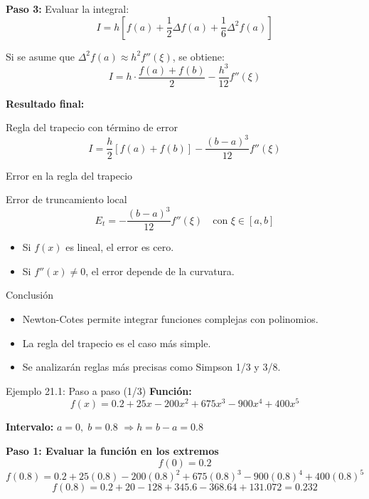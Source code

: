\documentclass[main.tex]{subfiles}
\begin{document}
\begin{frame}
    
\textbf{Paso 3:} Evaluar la integral:
\[ I = h \left[ f(a) + \frac{1}{2} \Delta f(a) + \frac{1}{6} \Delta^2 f(a) \right] \]

Si se asume que \( \Delta^2 f(a) \approx h^2 f''(\xi) \), se obtiene:
\[ I = h \cdot \frac{f(a) + f(b)}{2} - \frac{h^3}{12} f''(\xi) \]

\textbf{Resultado final:}
\begin{block}{Regla del trapecio con término de error}
\[ I = \frac{h}{2} [f(a) + f(b)] - \frac{(b - a)^3}{12} f''(\xi) \]
\end{block}
\end{frame}
\begin{frame}{Error en la regla del trapecio}
  \begin{block}{Error de truncamiento local}
    \[ E_t = -\frac{(b - a)^3}{12} f''(\xi) \quad \text{con } \xi \in [a,b] \]
  \end{block}
  \begin{itemize}
    \item Si \( f(x) \) es lineal, el error es cero.
    \item Si \( f''(x) \neq 0 \), el error depende de la curvatura.
  \end{itemize}
\end{frame}

\begin{frame}{Conclusión}
  \begin{itemize}
    \item Newton-Cotes permite integrar funciones complejas con polinomios.
    \item La regla del trapecio es el caso más simple.
    \item Se analizarán reglas más precisas como Simpson 1/3 y 3/8.
  \end{itemize}
\end{frame}

\begin{frame}{Ejemplo 21.1: Paso a paso (1/3)}
\textbf{Función:}
\[ f(x) = 0.2 + 25x - 200x^2 + 675x^3 - 900x^4 + 400x^5 \]

\textbf{Intervalo:} \( a = 0, \; b = 0.8 \) \( \Rightarrow h = b - a = 0.8 \)

\textbf{Paso 1: Evaluar la función en los extremos}
\[ f(0) = 0.2 \]
\[ f(0.8) = 0.2 + 25(0.8) - 200(0.8)^2 + 675(0.8)^3 - 900(0.8)^4 + 400(0.8)^5 \]
\[ f(0.8) = 0.2 + 20 - 128 + 345.6 - 368.64 + 131.072 = 0.232 \]
\end{frame}
\end{document}
